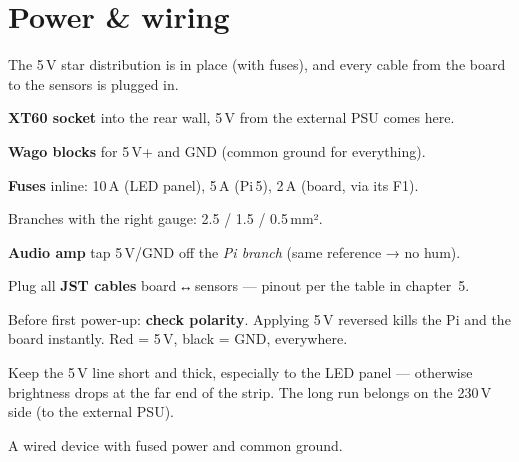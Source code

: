 \clearpage
\section{Power \& wiring}
\begin{ziel}
The 5\,V star distribution is in place (with fuses), and every cable from the board to the
sensors is plugged in.
\end{ziel}
\begin{schritte}
  \item \textbf{XT60 socket} into the rear wall, 5\,V from the external PSU comes here.
  \item \textbf{Wago blocks} for 5\,V+ and GND (common ground for everything).
  \item \textbf{Fuses} inline: 10\,A (LED panel), 5\,A (Pi\,5), 2\,A (board, via its F1).
  \item Branches with the right gauge: 2.5 / 1.5 / 0.5\,mm².
  \item \textbf{Audio amp} tap 5\,V/GND off the \emph{Pi branch} (same reference → no hum).
  \item Plug all \textbf{JST cables} board\,↔\,sensors — pinout per the table in chapter~5.
\end{schritte}
\begin{achtung}
Before first power-up: \textbf{check polarity}. Applying 5\,V reversed kills the Pi and the
board instantly. Red = 5\,V, black = GND, everywhere.
\end{achtung}
\begin{tipp}
Keep the 5\,V line short and thick, especially to the LED panel — otherwise brightness drops
at the far end of the strip. The long run belongs on the 230\,V side (to the external PSU).
\end{tipp}
\begin{ergebnis}
A wired device with fused power and common ground.
\end{ergebnis}

\clearpage
